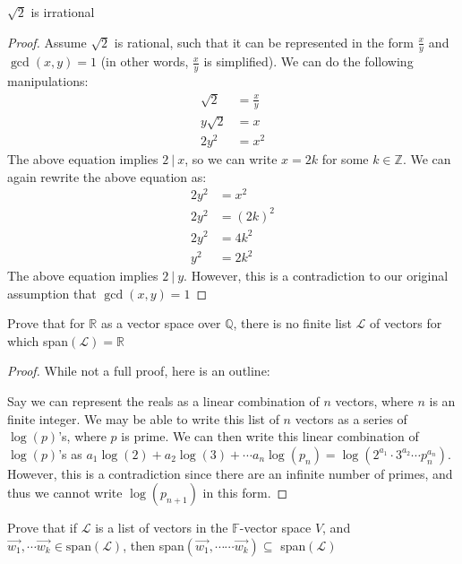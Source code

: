 \documentclass[11pt]{article}
\newcommand{\Z}{\mathbb{Z}}
\newcommand{\Q}{\mathbb{Q}}
\newcommand{\R}{\mathbb{R}}
\newcommand{\F}{\mathbb{F}}
\newcommand{\Lagr}{\mathcal{L}}
\begin{document}
\begin{lemma}[1]
    $\sqrt{2}$ is irrational
\end{lemma}
\begin{proof}
    Assume $\sqrt{2}$ is rational, such that it can be represented in the form $\frac{x}{y}$ and $\gcd(x, y) = 1$ (in other words, $\frac{x}{y}$ is simplified). We can do the following manipulations:
    \begin{align*}
        \sqrt{2} &= \frac{x}{y} \\
        y \sqrt{2} &= x \\
        2 y^2 &= x^2
    \end{align*}
    The above equation implies $2\ |\ x$, so we can write $x=2k$ for some $k\in\Z$. We can again rewrite the above equation as:
    \begin{align*}
        2 y^2 &= x^2 \\
        2 y^2 &= (2k)^2 \\
        2 y^2 &= 4k^2 \\
        y^2 &= 2k^2
    \end{align*}
    The above equation implies $2 \ |\ y$. However, this is a contradiction to our original assumption that $\gcd(x, y) = 1$
\end{proof}


\begin{problem}[Problem 4C]
    Prove that for $\R$ as a vector space over $\Q$, there is no finite list $\Lagr$ of vectors for which span$(\Lagr)=\R$
\end{problem}

\begin{proof}
While not a full proof, here is an outline:

Say we can represent the reals as a linear combination of $n$ vectors, where $n$ is an finite integer. We may be able to write this list of $n$ vectors as a series of $\log(p)$'s, where $p$ is prime. We can then write this linear combination of $\log(p)$'s as $a_1\log(2) + a_2\log(3) +\cdots a_n \log(p_n) = \log(2^{a_1} \cdot 3^{a_2} \cdots p_n^{a_n})$. However, this is a contradiction since there are an infinite number of primes, and thus we cannot write $\log(p_{n+1})$ in this form.
\end{proof}

\begin{problem}[Problem 5]
    Prove that if $\Lagr$ is a list of vectors in the $\F$-vector space $V$, and $\vec{w_1}, \cdots \vec{w_k} \in \text{span}(\Lagr)$, then span$(\vec{w_1}, \cdots \cdots \vec{w_k}) \subseteq$ span$(\Lagr)$
\end{problem}
\end{document}
